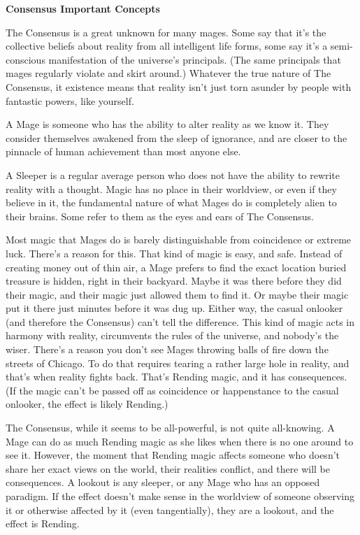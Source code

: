 \documentclass[letterpaper,12pt]{article}
\newcommand{\TITLE}[1]{\begin{center}{\titlefont\Huge\textbf{#1}}\end{center}}
\newcommand{\SECTION}[1]{\vspace{.5em}{\noindent\titlefont\large\textbf{#1}}

}
\begin{document}
\TITLE{Consensus Important Concepts}

\SECTION{The Consensus}
The Consensus is a great unknown for many mages. Some say that it's
the collective beliefs about reality from all intelligent life forms,
some say it's a semi-conscious manifestation of the universe's
principals. (The same principals that mages regularly violate and
skirt around.) Whatever the true nature of The Consensus, it existence
means that reality isn't just torn asunder by people with fantastic
powers, like yourself.

\SECTION{Mage}
A Mage is someone who has the ability to alter reality as we know
it. They consider themselves awakened from the sleep of ignorance, and
are closer to the pinnacle of human achievement than most anyone
else.

\SECTION{Sleeper}
A Sleeper is a regular average person who does not have the ability to
rewrite reality with a thought. Magic has no place in their worldview,
or even if they believe in it, the fundamental nature of what Mages do
is completely alien to their brains. Some refer to them as the eyes
and ears of The Consensus.

\SECTION{Rending Magic}
Most magic that Mages do is barely distinguishable from coincidence or
extreme luck. There's a reason for this. That kind of magic is easy,
and safe. Instead of creating money out of thin air, a Mage prefers to
find the exact location buried treasure is hidden, right in their
backyard. Maybe it was there before they did their magic, and their
magic just allowed them to find it. Or maybe their magic put it there
just minutes before it was dug up. Either way, the casual onlooker
(and therefore the Consensus) can't tell the difference. This kind of
magic acts in harmony with reality, circumvents the rules of the
universe, and nobody's the wiser. There's a reason you don't see Mages
throwing balls of fire down the streets of Chicago. To do that
requires tearing a rather large hole in reality, and that's when
reality fights back. That's Rending magic, and it has
consequences. (If the magic can't be passed off as coincidence or
happenstance to the casual onlooker, the effect is likely Rending.)

\SECTION{Lookout}
The Consensus, while it seems to be all-powerful, is not quite
all-knowing. A Mage can do as much Rending magic as she likes when
there is no one around to see it. However, the moment that Rending
magic affects someone who doesn't share her exact views on the world,
their realities conflict, and there will be consequences. A lookout
is any sleeper, or any Mage who has an opposed paradigm. If the effect
doesn't make sense in the worldview of someone observing it or
otherwise affected by it (even tangentially), they are a lookout, and
the effect is Rending.
\end{document}
